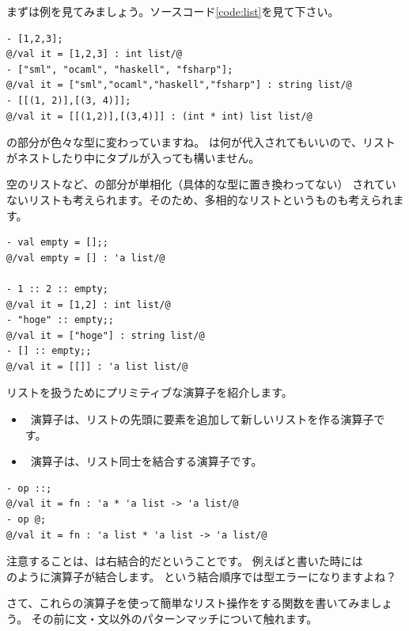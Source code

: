 \documentclass[11pt,a4paper]{jarticle}
\begin{document}
まずは例を見てみましょう。ソースコード\ref{code:list}を見て下さい。

\begin{lstlisting}[caption=色々なリスト,label=code:list]
- [1,2,3];
@/val it = [1,2,3] : int list/@
- ["sml", "ocaml", "haskell", "fsharp"];
@/val it = ["sml","ocaml","haskell","fsharp"] : string list/@
- [[(1, 2)],[(3, 4)]];
@/val it = [[(1,2)],[(3,4)]] : (int * int) list list/@
\end{lstlisting}

の部分が色々な型に変わっていますね。
は何が代入されてもいいので、リストがネストしたり中にタプルが入っても構いません。

空のリストなど、の部分が単相化（具体的な型に置き換わってない）
されていないリストも考えられます。そのため、多相的なリストというものも考えられます。

\begin{lstlisting}[caption=多相的なリスト,label=code:poly-list]
- val empty = [];;
@/val empty = [] : 'a list/@

- 1 :: 2 :: empty;
@/val it = [1,2] : int list/@
- "hoge" :: empty;;
@/val it = ["hoge"] : string list/@
- [] :: empty;;
@/val it = [[]] : 'a list list/@
\end{lstlisting}

リストを扱うためにプリミティブな演算子を紹介します。
\begin{itemize}
\item \prog{::} \ 演算子は、リストの先頭に要素を追加して新しいリストを作る演算子です。
\item {} \ 演算子は、リスト同士を結合する演算子です。
\end{itemize}

\begin{lstlisting}[caption=リスト操作演算子の型,label=code:list-operators]
- op ::;
@/val it = fn : 'a * 'a list -> 'a list/@
- op @;
@/val it = fn : 'a list * 'a list -> 'a list/@
\end{lstlisting}

注意することは、\prog{::}は右結合的だということです。
例えばと書いた時には \\
のように演算子が結合します。
という結合順序では型エラーになりますよね？

さて、これらの演算子を使って簡単なリスト操作をする関数を書いてみましょう。
その前に文・文以外のパターンマッチについて触れます。
\end{document}
